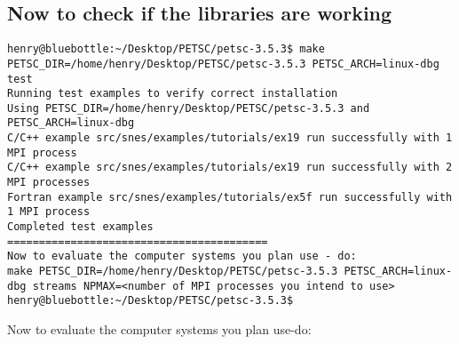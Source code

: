 \documentclass{article}
\begin{document}
\subsection{Now to check if the libraries are working}
\begin{scriptsize}\begin{verbatim}
henry@bluebottle:~/Desktop/PETSC/petsc-3.5.3$ make PETSC_DIR=/home/henry/Desktop/PETSC/petsc-3.5.3 PETSC_ARCH=linux-dbg test
Running test examples to verify correct installation
Using PETSC_DIR=/home/henry/Desktop/PETSC/petsc-3.5.3 and PETSC_ARCH=linux-dbg
C/C++ example src/snes/examples/tutorials/ex19 run successfully with 1 MPI process
C/C++ example src/snes/examples/tutorials/ex19 run successfully with 2 MPI processes
Fortran example src/snes/examples/tutorials/ex5f run successfully with 1 MPI process
Completed test examples
=========================================
Now to evaluate the computer systems you plan use - do:
make PETSC_DIR=/home/henry/Desktop/PETSC/petsc-3.5.3 PETSC_ARCH=linux-dbg streams NPMAX=<number of MPI processes you intend to use>
henry@bluebottle:~/Desktop/PETSC/petsc-3.5.3$ 
\end{verbatim}\end{scriptsize}
Now to evaluate the computer systems you plan use-do:
\end{document}
